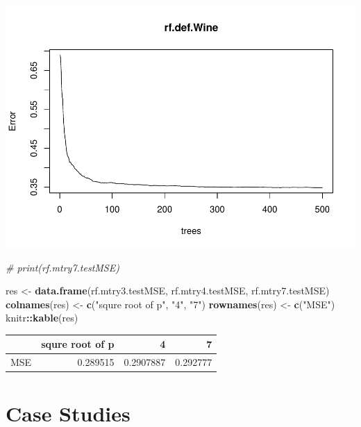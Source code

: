\documentclass[
]{book}
\newenvironment{Shaded}{\begin{snugshade}}{\end{snugshade}}
\newcommand{\CommentTok}[1]{\textcolor[rgb]{0.56,0.35,0.01}{\textit{#1}}}
\newcommand{\FunctionTok}[1]{\textcolor[rgb]{0.13,0.29,0.53}{\textbf{#1}}}
\newcommand{\NormalTok}[1]{#1}
\newcommand{\OtherTok}[1]{\textcolor[rgb]{0.56,0.35,0.01}{#1}}
\newcommand{\SpecialCharTok}[1]{\textcolor[rgb]{0.81,0.36,0.00}{\textbf{#1}}}
\newcommand{\StringTok}[1]{\textcolor[rgb]{0.31,0.60,0.02}{#1}}
\begin{document}
\includegraphics{bookdown-demo_files/figure-latex/unnamed-chunk-17-2.pdf}

\begin{Shaded}
\begin{Highlighting}[]
\CommentTok{\# print(rf.mtry7.testMSE)}
\end{Highlighting}
\end{Shaded}

\begin{Shaded}
\begin{Highlighting}[]
\NormalTok{res }\OtherTok{\textless{}{-}} \FunctionTok{data.frame}\NormalTok{(rf.mtry3.testMSE, rf.mtry4.testMSE, rf.mtry7.testMSE)}
\FunctionTok{colnames}\NormalTok{(res) }\OtherTok{\textless{}{-}} \FunctionTok{c}\NormalTok{(}\StringTok{"squre root of p"}\NormalTok{, }\StringTok{"4"}\NormalTok{, }\StringTok{"7"}\NormalTok{)}
\FunctionTok{rownames}\NormalTok{(res) }\OtherTok{\textless{}{-}} \FunctionTok{c}\NormalTok{(}\StringTok{"MSE"}\NormalTok{)}
\NormalTok{knitr}\SpecialCharTok{::}\FunctionTok{kable}\NormalTok{(res)}
\end{Highlighting}
\end{Shaded}

\begin{tabular}{l|r|r|r}
\hline
  & squre root of p & 4 & 7\\
\hline
MSE & 0.289515 & 0.2907887 & 0.292777\\
\hline
\end{tabular}

\hypertarget{case-studies}{%
\chapter{Case Studies}\label{case-studies}}
\end{document}
